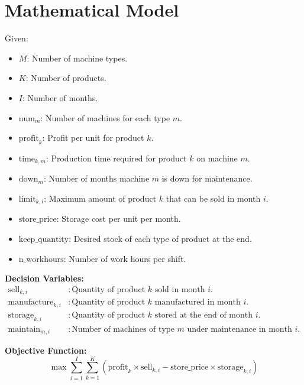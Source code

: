 \documentclass{article}
\begin{document}
\section*{Mathematical Model}

Given:
\begin{itemize}
    \item \( M \): Number of machine types.
    \item \( K \): Number of products.
    \item \( I \): Number of months.
    \item \( \text{num}_m \): Number of machines for each type \( m \).
    \item \( \text{profit}_k \): Profit per unit for product \( k \).
    \item \( \text{time}_{k,m} \): Production time required for product \( k \) on machine \( m \).
    \item \( \text{down}_m \): Number of months machine \( m \) is down for maintenance.
    \item \( \text{limit}_{k,i} \): Maximum amount of product \( k \) that can be sold in month \( i \).
    \item \( \text{store\_price} \): Storage cost per unit per month.
    \item \( \text{keep\_quantity} \): Desired stock of each type of product at the end.
    \item \( \text{n\_workhours} \): Number of work hours per shift.
\end{itemize}

\textbf{Decision Variables:}
\begin{align*}
    \text{sell}_{k,i} & : \text{Quantity of product } k \text{ sold in month } i. \\
    \text{manufacture}_{k,i} & : \text{Quantity of product } k \text{ manufactured in month } i. \\
    \text{storage}_{k,i} & : \text{Quantity of product } k \text{ stored at the end of month } i. \\
    \text{maintain}_{m,i} & : \text{Number of machines of type } m \text{ under maintenance in month } i.
\end{align*}

\textbf{Objective Function:}
\[
    \max \sum_{i=1}^{I} \sum_{k=1}^{K} \left( \text{profit}_k \times \text{sell}_{k,i} - \text{store\_price} \times \text{storage}_{k,i} \right)
\]
\end{document}
